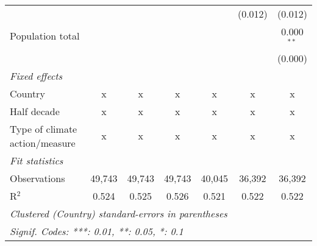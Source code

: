 \begin{tabular}{lcccccc}
                                                                                &         &               &                &                & (0.012)        & (0.012)\\   
   Population total                                                             &         &               &                &                &                & 0.000$^{**}$\\   
                                                                                &         &               &                &                &                & (0.000)\\   
   \emph{Fixed effects}\\
   Country                                                                      & x       & x             & x              & x              & x              & x\\  
   Half decade                                                                  & x       & x             & x              & x              & x              & x\\  
   Type of climate action/measure                                               & x       & x             & x              & x              & x              & x\\  
   \midrule \emph{Fit statistics}\\
   Observations                                                                 & 49,743  & 49,743        & 49,743         & 40,045         & 36,392         & 36,392\\  
   R$^2$                                                                        & 0.524   & 0.525         & 0.526          & 0.521          & 0.522          & 0.522\\  
   \midrule
   \multicolumn{7}{l}{\emph{Clustered (Country) standard-errors in parentheses}}\\
   \multicolumn{7}{l}{\emph{Signif. Codes: ***: 0.01, **: 0.05, *: 0.1}}\\
\end{tabular}
\par\endgroup


